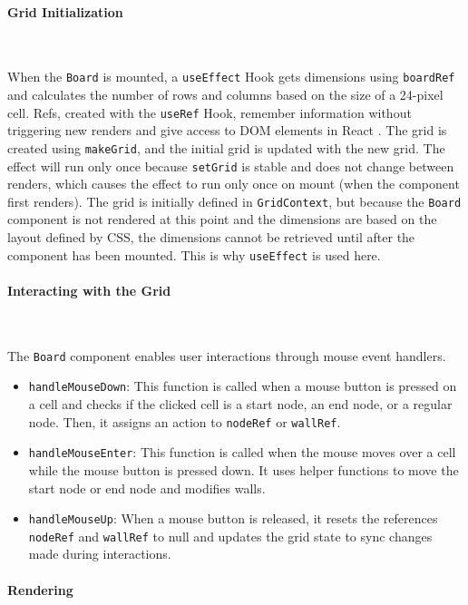 \paragraph{Grid Initialization} \

When the \texttt{Board} is mounted, a \texttt{useEffect} Hook \cite{react-hooks} gets dimensions using \texttt{boardRef} and calculates the number of rows and columns based on the size of a 24-pixel cell. Refs, created with the \texttt{useRef} Hook, remember information without triggering new renders and give access to DOM elements in React \cite{react-hooks}. The grid is created using \texttt{makeGrid}, and the initial grid is updated with the new grid. The effect will run only once because \texttt{setGrid} is stable and does not change between renders, which causes the effect to run only once on mount (when the component first renders). The grid is initially defined in \texttt{GridContext}, but because the \texttt{Board} component is not rendered at this point and the dimensions are based on the layout defined by CSS, the dimensions cannot be retrieved until after the component has been mounted. This is why \texttt{useEffect} is used here.

\paragraph{Interacting with the Grid} \

The \texttt{Board} component enables user interactions through mouse event handlers.

\begin{itemize}
    \item \texttt{handleMouseDown}: This function is called when a mouse button is pressed on a cell and checks if the clicked cell is a start node, an end node, or a regular node. Then, it assigns an action to \texttt{nodeRef} or \texttt{wallRef}.
    \item \texttt{handleMouseEnter}: This function is called when the mouse moves over a cell while the mouse button is pressed down. It uses helper functions to move the start node or end node and modifies walls.
    \item \texttt{handleMouseUp}: When a mouse button is released, it resets the references \texttt{nodeRef} and \texttt{wallRef} to null and updates the grid state to sync changes made during interactions.
\end{itemize}

\paragraph{Rendering} \

